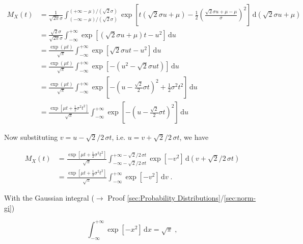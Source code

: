 \documentclass[a4paper,12pt,twoside]{book}
\begin{document}
\begin{equation} \label{eq:norm-mgf-norm-mgf-s2}
\begin{split}
M_X(t) &= \frac{1}{\sqrt{2 \pi} \sigma} \int_{(-\infty-\mu)/(\sqrt{2}\sigma)}^{(+\infty-\mu)/(\sqrt{2}\sigma)} \exp\left[ t\left( \sqrt{2} \sigma u + \mu \right) - \frac{1}{2} \left( \frac{ \sqrt{2} \sigma u + \mu - \mu}{\sigma} \right)^2 \right] \, \mathrm{d}\left( \sqrt{2} \sigma u + \mu \right) \\
&= \frac{\sqrt{2} \sigma}{\sqrt{2 \pi} \sigma} \int_{-\infty}^{+\infty} \exp\left[ \left( \sqrt{2} \sigma u + \mu \right) t - u^2 \right] \, \mathrm{d}u \\
&= \frac{\exp(\mu t)}{\sqrt{\pi}} \int_{-\infty}^{+\infty} \exp\left[ \sqrt{2} \sigma u t - u^2 \right] \, \mathrm{d}u \\
&= \frac{\exp(\mu t)}{\sqrt{\pi}} \int_{-\infty}^{+\infty} \exp\left[ - \left( u^2 - \sqrt{2} \sigma u t \right) \right] \, \mathrm{d}u \\
&= \frac{\exp(\mu t)}{\sqrt{\pi}} \int_{-\infty}^{+\infty} \exp\left[ - \left( u - \frac{\sqrt{2}}{2} \sigma t \right)^2 + \frac{1}{2} \sigma^2 t^2 \right] \, \mathrm{d}u \\
&= \frac{\exp\left[ \mu t + \frac{1}{2} \sigma^2 t^2 \right]}{\sqrt{\pi}} \int_{-\infty}^{+\infty} \exp\left[ - \left( u - \frac{\sqrt{2}}{2} \sigma t \right)^2 \right] \, \mathrm{d}u
\end{split}
\end{equation}

Now substituting $v = u - \sqrt{2}/2 \, \sigma t$, i.e. $u = v + \sqrt{2}/2 \, \sigma t$, we have

\begin{equation} \label{eq:norm-mgf-norm-mgf-s3}
\begin{split}
M_X(t) &= \frac{\exp\left[ \mu t + \frac{1}{2} \sigma^2 t^2 \right]}{\sqrt{\pi}} \int_{-\infty - \sqrt{2}/2 \, \sigma t}^{+\infty - \sqrt{2}/2 \, \sigma t} \exp\left[ -v^2 \right] \, \mathrm{d}\left( v + \sqrt{2}/2 \, \sigma t \right) \\
&= \frac{\exp\left[ \mu t + \frac{1}{2} \sigma^2 t^2 \right]}{\sqrt{\pi}} \int_{-\infty}^{+\infty} \exp\left[ -v^2 \right] \, \mathrm{d}v \; .
\end{split}
\end{equation}

With the Gaussian integral ($\rightarrow$ Proof \ref{sec:Probability Distributions}/\ref{sec:norm-gi})

\begin{equation} \label{eq:norm-mgf-gauss}
\int_{-\infty}^{+\infty} \exp\left[ -x^2 \right] \, \mathrm{d}x = \sqrt{\pi} \; ,
\end{equation}
\end{document}
